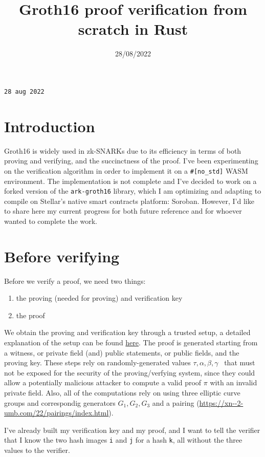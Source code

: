 \documentclass{article}
\title{Groth16 proof verification from scratch in Rust}
\date{28/08/2022}
\begin{document}
\maketitle

\texttt{28 aug 2022}

\section{Introduction}
Groth16 is widely used in zk-SNARKs due to its efficiency in terms of both proving and verifying, and the succinctness of the proof. I've been experimenting on the verification algorithm in order to implement it on a \texttt{#[no_std]} WASM environment.
The implementation is not complete and I've decided to work on a forked version of the \texttt{ark-groth16} library, which I am optimizing and adapting to compile on Stellar's native smart contracts platform: Soroban.
However, I'd like to share here my current progress for both future reference and for whoever wanted to complete the work.

\section{Before verifying}

Before we verify a proof, we need two things:

\begin{enumerate}
\item the proving (needed for proving) and verification key
\item the proof
\end{enumerate}

We obtain the proving and verification key through a trusted setup, a detailed explanation of the setup can be found \href{https://xn--2-umb.com/22/groth16/index.html#trusted-setup}{here}.
The proof is generated starting from a witness, or private field (and) public statements, or public fields, and the proving key. These steps rely on randomly-generated values \( \tau,\alpha,\beta,\gamma \) \ that must not be exposed for the security of the proving/verfying system, since they could allow a potentially malicious attacker to compute a valid proof \( \pi \) with an invalid private field.
Also, all of the computations rely on using three elliptic curve groups and correspondig generators \( G_1, G_2, G_3 \) and a pairing (\url{https://xn--2-umb.com/22/pairings/index.html}). 

I've already built my verification key and my proof, and I want to tell the verifier that I know the two hash images \texttt{i} and \texttt{j} for a hash \texttt{k}, all without the three values to the verifier.
\end{document}
